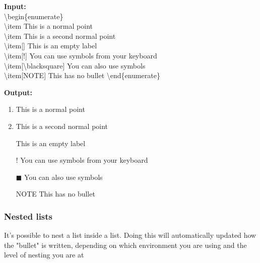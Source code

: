 \documentclass{article}
\newcommand{\bs}[1]{\textbackslash{}#1} %
\begin{document}
\begin{multicols}{2}
    \begin{minipage}{\linewidth}
        \textbf{Input:} \\
        \bs{begin\{enumerate\}} \\
        \bs{item} This is a normal point \\
        \bs{item} This is a second normal point \\
        \bs{item}[] This is an empty label \\
        \bs{item}[!] You can use symbols from your keyboard \\
        \bs{item}[\bs{blacksquare}] You can also use symbols \\
        \bs{item}[NOTE] This has no bullet
        \bs{end\{enumerate\}}
    \end{minipage}

    \begin{minipage}{\linewidth}
        \textbf{Output:} \\
        \begin{enumerate}
            \item This is a normal point 
            \item This is a second normal point 
            \item [] This is an empty label 
            \item [!] You can use symbols from your keyboard
            \item [$\blacksquare$] You can also use symbols
            \item [NOTE] This has no bullet
        \end{enumerate}
    \end{minipage}
\end{multicols}

\subsubsection{Nested lists}
It's possible to nest a list inside a list. Doing this will automatically updated
how the "bullet" is written, depending on which environment you are using and
the level of nesting you are at
\end{document}
